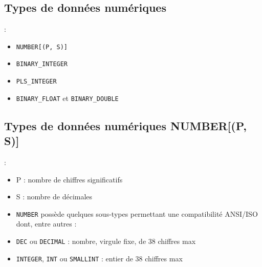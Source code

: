 \documentclass[10pt]{beamer}
\begin{document}
\subsection{Types de données numériques}
\begin{frame}{\secname : \subsecname}
    \begin{itemize}
        \item \lstinline[language=xml]!NUMBER[(P, S)]!
        \item \lstinline[language=xml]!BINARY_INTEGER!
        \item \lstinline[language=xml]!PLS_INTEGER!
        \item \lstinline[language=xml]!BINARY_FLOAT! et \lstinline[language=xml]!BINARY_DOUBLE!
    \end{itemize}

\end{frame}

\subsection{Types de données numériques NUMBER[(P, S)]}
\begin{frame}{\secname : \subsecname}
    \begin{itemize}
        \item P : nombre de chiffres significatifs
        \item S : nombre de décimales
        \item \lstinline[language=xml]!NUMBER! possède quelques sous-types permettant une compatibilité ANSI/ISO dont, entre autres :
        \item \lstinline[language=xml]!DEC! ou \lstinline[language=xml]!DECIMAL! : nombre, virgule fixe, de 38 chiffres max
        \item \lstinline[language=xml]!INTEGER!, \lstinline[language=xml]!INT! ou \lstinline[language=xml]!SMALLINT! : entier de 38 chiffres max
    \end{itemize}
\end{frame}
\end{document}

